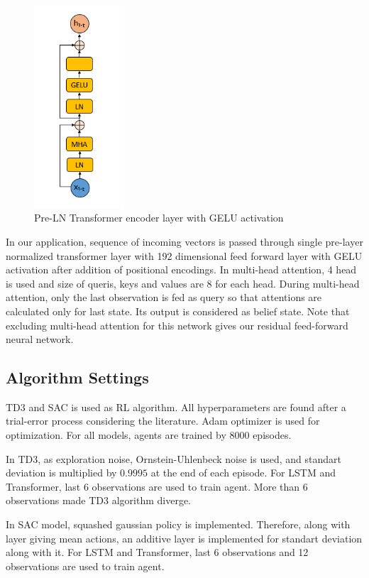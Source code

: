 \documentclass[a4paper, 12pt]{article} %
\begin{document}
\begin{figure}
	\centering
	\includegraphics[width=0.3\textwidth]{figures/ml_theory/transformer_block.png}
	\caption{Pre-LN Transformer encoder layer with GELU activation}
	\label{fig:pre_trsf}
\end{figure}

In our application, sequence of incoming vectors is passed through single pre-layer normalized transformer layer with 192 dimensional feed forward layer with GELU activation after addition of positional encodings. 
In multi-head attention, 4 head is used and size of queris, keys and values are 8 for each head.
During multi-head attention, only the last observation is fed as query so that attentions are calculated only for last state.  
Its output is considered as belief state.
Note that excluding multi-head attention for this network gives our residual feed-forward neural network.

\subsection{Algorithm Settings}
TD3 and SAC is used as RL algorithm. 
All hyperparameters are found after a trial-error process considering the literature. Adam optimizer is used for optimization. 
For all models, agents are trained by 8000 episodes.

In TD3, as exploration noise, Ornstein-Uhlenbeck noise is used, and standart deviation is multiplied  by $0.9995$ at the end of each episode. For LSTM and Transformer, last 6 observations are used to train agent. 
More than 6 observations made TD3 algorithm diverge.

In SAC model, squashed gaussian policy is implemented. 
Therefore, along with layer giving mean actions, an additive layer is implemented for standart deviation along with it. 
For LSTM and Transformer, last 6 observations and 12 observations are used to train agent. 
\end{document}
